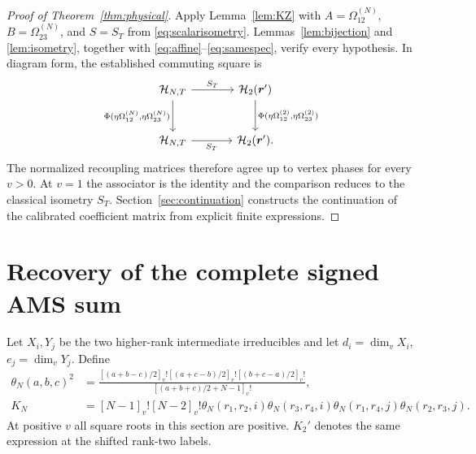 \documentclass[10pt,a4paper]{article}
\newcommand{\qf}[1]{[#1]_v!}
\begin{document}
\begin{proof}[Proof of Theorem~\ref{thm:physical}]
Apply Lemma~\ref{lem:KZ} with $A=\Omega_{12}^{(N)}$,
$B=\Omega_{23}^{(N)}$, and $S=S_T$ from \eqref{eq:scalarisometry}.
Lemmas~\ref{lem:bijection} and \ref{lem:isometry}, together with
\eqref{eq:affine}--\eqref{eq:samespec}, verify every hypothesis.
In diagram form, the established commuting square is
\[
\begin{tikzcd}[column sep=large,row sep=large]
\mathcal H_{N,T} \arrow[r,"S_T"]
 \arrow[d,"{\Phi(\eta\Omega^{(N)}_{12},\eta\Omega^{(N)}_{23})}"']
 &\mathcal H_{2}(\boldsymbol r')
 \arrow[d,"{\Phi(\eta\Omega^{(2)}_{12},\eta\Omega^{(2)}_{23})}"]\\
\mathcal H_{N,T} \arrow[r,"S_T"']&\mathcal H_{2}(\boldsymbol r').
\end{tikzcd}
\]
The normalized recoupling matrices therefore agree up to vertex phases
for every $v>0$. At $v=1$ the associator is the identity and the comparison
reduces to the classical isometry $S_T$. Section~\ref{sec:continuation}
constructs the continuation of the calibrated coefficient matrix from
explicit finite expressions.
\end{proof}

\section{Recovery of the complete signed AMS sum}
Let $X_i,Y_j$ be the two higher-rank intermediate irreducibles and let
$d_i=\dim_v X_i$, $e_j=\dim_v Y_j$. Define
\begin{align}
 \theta_N(a,b,c)^2
 &=\frac{\qf{(a+b-c)/2}\qf{(a+c-b)/2}\qf{(b+c-a)/2}}
          {\qf{(a+b+c)/2+N-1}},\label{eq:theta}\\
 K_N&=\qf{N-1}\qf{N-2}
 \theta_N(r_1,r_2,i)\theta_N(r_3,r_4,i)
 \theta_N(r_1,r_4,j)\theta_N(r_2,r_3,j).\label{eq:KN}
\end{align}
At positive $v$ all square roots in this section are positive.
$K_2'$ denotes the same expression at the shifted rank-two labels.
\end{document}
